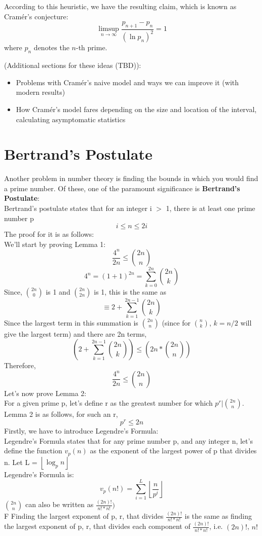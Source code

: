 \documentclass[conference]{IEEEtran}
\begin{document}
According to this heuristic, we have the resulting claim, which is known as Cram\'er's conjecture:
\[\limsup_{n \to \infty} \frac{p_{n + 1} - p_n}{(\ln p_n)^2} = 1\]
where $p_n$ denotes the $n$-th prime.

(Additional sections for these ideas (TBD)):
\begin{itemize}
  \item Problems with Cram\'er's naive model and ways we can improve it (with modern results)
  \item How Cram\'er's model fares depending on the size and location of the interval, calculating asymptomatic statistics
\end{itemize}

\section{Bertrand's Postulate}
Another problem in number theory is finding the bounds in which you would find a prime number. Of these, one of the paramount significance is \textbf{Bertrand's Postulate}: \\
Bertrand's postulate states that for an integer i $>$ 1, there is at least one prime number p
\[
    i \leq n \leq 2i 
\]
The proof for it is as follows:\\
We'll start by proving Lemma 1:
\[
    \frac{4^n}{2n} \leq \binom{2n}{n}
\]
\[
  4^n = (1 + 1)^{2n} = \sum_{k = 0}^{2n} \binom{2n}{k}
\]
Since, $\binom{2n}{0}$ is 1 and $\binom{2n}{2n}$ is 1, this is the same as
\[
    \equiv 2 + \sum_{k = 1}^{2n - 1} \binom{2n}{k} 
\]
Since the largest term in this summation is $\binom{2n}{n}$ (since for $\binom{n}{k}$, $k = n/2$ will give the largest term) and there are 2n terms, 
\[
     (2 + \sum_{k = 1}^{2n - 1} \binom{2n}{k}) \leq (2n * \binom{2n}{n})
\]
Therefore, 
\[
    \frac{4^n}{2n} \leq \binom{2n}{n}
\]
Let's now prove Lemma 2:\\
For a given prime p, let's define r as the greatest number for which $p^r | \binom{2n}{n}$. Lemma 2 is as follows, for such an r, 
\[
    p^r \le 2n
\]
Firstly, we have to introduce Legendre's Formula:\\
Legendre's Formula states that for any prime number p, and any integer n, let's define the function $v_p(n)$ as the exponent of the largest power of p that divides n. Let L = $\left\lfloor \log_{p}{n} \right\rfloor$\\
Legendre's Formula is:
\[
    v_{p}(n!) = \sum_{i = 1}^{L} {\left\lfloor \frac{n}{p^i} \right\rfloor}
\]
$\binom{2n}{n}$ can also be written as $\frac{(2n)!}{n!*n!})$\\F
Finding the largest exponent of p, r, that divides $\frac{(2n)!}{n!*n!}$ is the same as finding the largest exponent of p, r, that divides each component of $\frac{(2n)!}{n!*n!}$, i.e. $(2n)!$, $n!$
\end{document}
